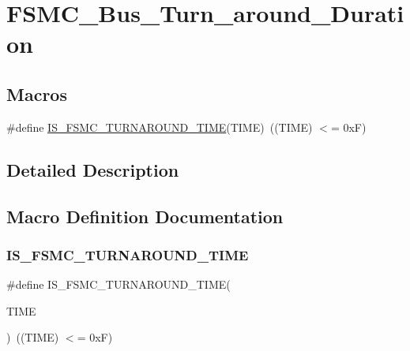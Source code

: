\hypertarget{group___f_s_m_c___bus___turn__around___duration}{}\section{F\+S\+M\+C\+\_\+\+Bus\+\_\+\+Turn\+\_\+around\+\_\+\+Duration}
\label{group___f_s_m_c___bus___turn__around___duration}
\subsection*{Macros}
\begin{DoxyCompactItemize}
\item 
\#define \mbox{\hyperlink{group___f_s_m_c___bus___turn__around___duration_ga9ec626f30679a18af91bf48c52d9260d}{I\+S\+\_\+\+F\+S\+M\+C\+\_\+\+T\+U\+R\+N\+A\+R\+O\+U\+N\+D\+\_\+\+T\+I\+ME}}(T\+I\+ME)~((T\+I\+ME) $<$= 0x\+F)
\end{DoxyCompactItemize}


\subsection{Detailed Description}


\subsection{Macro Definition Documentation}
\mbox{\label{group___f_s_m_c___bus___turn__around___duration_ga9ec626f30679a18af91bf48c52d9260d}} 
\subsubsection{\texorpdfstring{IS\_FSMC\_TURNAROUND\_TIME}{IS\_FSMC\_TURNAROUND\_TIME}}
{\footnotesize\ttfamily \#define I\+S\+\_\+\+F\+S\+M\+C\+\_\+\+T\+U\+R\+N\+A\+R\+O\+U\+N\+D\+\_\+\+T\+I\+ME(\begin{DoxyParamCaption}\item[{}]{T\+I\+ME }\end{DoxyParamCaption})~((T\+I\+ME) $<$= 0x\+F)}

